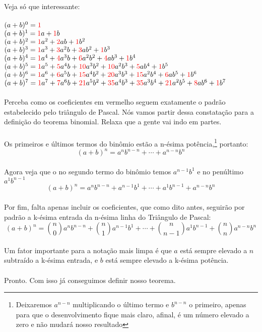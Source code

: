 \documentclass[main.tex]{subfiles}
\begin{document}
Veja só que interessante:
\\~\\
$(a+b)^0 = \textcolor{red}{1}$ \\
$(a+b)^1 = \textcolor{red}{1}a + \textcolor{red}{1}b$ \\
$(a+b)^2 = \textcolor{red}{1}a^2 + \textcolor{red}{2}ab + \textcolor{red}{1}b^2$ \\
$(a+b)^3 = \textcolor{red}{1}a^3 + \textcolor{red}{3}a^2b + \textcolor{red}{3}ab^2 + \textcolor{red}{1}b^3$ \\
$(a+b)^4 = \textcolor{red}{1}a^4 + \textcolor{red}{4}a^3b + \textcolor{red}{6}a^2b^2 + \textcolor{red}{4}ab^3 + \textcolor{red}{1}b^4$ \\
$(a+b)^5 = \textcolor{red}{1}a^5 + \textcolor{red}{5}a^4b + \textcolor{red}{10}a^3b^2 + \textcolor{red}{10}a^2b^3 + \textcolor{red}{5}ab^4 + \textcolor{red}{1}b^5$ \\
$(a+b)^6 = \textcolor{red}{1}a^6 + \textcolor{red}{6}a^5b + \textcolor{red}{15}a^4b^2 + \textcolor{red}{20}a^3b^3 + \textcolor{red}{15}a^2b^4 + \textcolor{red}{6}ab^5 + \textcolor{red}{1}b^6$ \\
$(a+b)^7 = \textcolor{red}{1}a^7 + \textcolor{red}{7}a^6b + \textcolor{red}{21}a^5b^2 + \textcolor{red}{35}a^4b^3 + \textcolor{red}{35}a^3b^4 + \textcolor{red}{21}a^2b^5 + \textcolor{red}{8}ab^6 + \textcolor{red}{1}b^7$  \\~\\
Perceba como os coeficientes em vermelho seguem exatamente o padrão estabelecido pelo triângulo de Pascal. Nós vamos partir dessa constatação para a definição do teorema binomial. Relaxa que a gente vai indo em partes.
\\~\\
Os primeiros e últimos termos do binômio estão a n-ésima potência,\footnote{Deixaremos $a^{n-n}$ multiplicando o último termo e $b^{n-n}$ o primeiro, apenas para que o desenvolvimento fique mais claro, afinal, é um número elevado a zero e não mudará nosso resultado} portanto:
$$(a+b)^n = a^nb^{n-n} + \cdots + a^{n-n}b^n $$
\\
Agora veja que o no segundo termo do binômio temos $a^{n-1}b^1$ e no penúltimo $a^1b^{n-1}$
\\
$$(a+b)^n = a^nb^{n-n} + a^{n-1}b^1 + \cdots + a^1b^{n-1} + a^{n-n}b^n $$
\\
Por fim, falta apenas incluir os coeficientes, que como dito antes, seguirão por padrão a k-ésima entrada da n-ésima linha do Triângulo de Pascal:
\\
$$(a+b)^n = {n \choose 0}a^nb^{n-n} + {n \choose 1}a^{n-1}b^1 + \cdots + {n \choose n-1}a^1b^{n-1} + {n \choose n}a^{n-n}b^n $$
\\
Um fator importante para a notação mais limpa é que $a$ está sempre elevado a $n$ subtraído a k-ésima entrada, e $b$ está sempre elevado a k-ésima potência.
\\~\\
Pronto. Com isso já conseguimos definir nosso teorema.
\end{document}
